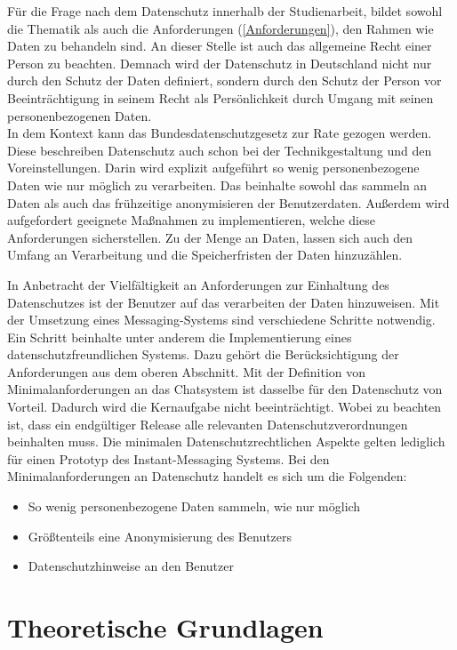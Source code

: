\documentclass[a4paper,titlepage,halfparskip,12pt]{scrreprt}
\begin{document}
\begin{onehalfspacing}
Für die Frage nach dem Datenschutz innerhalb der Studienarbeit, bildet sowohl die Thematik als auch die Anforderungen (\autoref{Anforderungen}), den Rahmen wie Daten zu behandeln sind. An dieser Stelle ist auch das allgemeine Recht einer Person zu beachten. Demnach wird der Datenschutz in Deutschland nicht nur durch den Schutz der Daten definiert, sondern durch den Schutz der Person vor Beeinträchtigung in seinem Recht als Persönlichkeit durch Umgang mit seinen personenbezogenen Daten. \cite{petrlic2017datenschutz}\\
In dem Kontext kann das Bundesdatenschutzgesetz zur Rate gezogen werden. Diese beschreiben Datenschutz auch schon bei der Technikgestaltung und den Voreinstellungen. Darin wird explizit aufgeführt so wenig personenbezogene Daten wie nur möglich zu verarbeiten. Das beinhalte sowohl das sammeln an Daten als auch das frühzeitige anonymisieren der Benutzerdaten. Außerdem wird aufgefordert geeignete Maßnahmen zu implementieren, welche diese Anforderungen sicherstellen. Zu der Menge an Daten, lassen sich auch den Umfang an Verarbeitung und die Speicherfristen der Daten hinzuzählen. \cite{bdsg2018}

In Anbetracht der Vielfältigkeit an Anforderungen zur Einhaltung des Datenschutzes ist der Benutzer auf das verarbeiten der Daten hinzuweisen. Mit der Umsetzung eines Messaging-Systems sind verschiedene Schritte notwendig. Ein Schritt beinhalte unter anderem die Implementierung eines datenschutzfreundlichen Systems. Dazu gehört die Berücksichtigung der Anforderungen aus dem oberen Abschnitt. Mit der Definition von Minimalanforderungen an das Chatsystem ist dasselbe für den Datenschutz von Vorteil. Dadurch wird die Kernaufgabe nicht beeinträchtigt. Wobei zu beachten ist, dass ein endgültiger Release alle relevanten Datenschutzverordnungen beinhalten muss. Die minimalen Datenschutzrechtlichen Aspekte gelten lediglich für einen Prototyp des Instant-Messaging Systems. Bei den Minimalanforderungen an Datenschutz handelt es sich um die Folgenden:
\begin{itemize}
	\item So wenig personenbezogene Daten sammeln, wie nur möglich
	\item Größtenteils eine Anonymisierung des Benutzers
	\item Datenschutzhinweise an den Benutzer
\end{itemize}




\pagebreak

\chapter{Theoretische Grundlagen}
\label{chap:Theorie}


\end{onehalfspacing}
\end{document}
